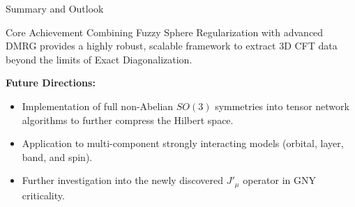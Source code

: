 \documentclass[xcolor=table, 11pt, aspectratio=169]{beamer}
\begin{document}
\begin{frame}{Summary and Outlook}
    \begin{block}{Core Achievement}
        Combining Fuzzy Sphere Regularization with advanced DMRG provides a highly robust, scalable framework to extract 3D CFT data beyond the limits of Exact Diagonalization.
    \end{block}
    \vspace{0.3cm}
    \textbf{Future Directions:}
    \begin{itemize}
        \item Implementation of full non-Abelian $SO(3)$ symmetries into tensor network algorithms to further compress the Hilbert space.
        \item Application to multi-component strongly interacting models (orbital, layer, band, and spin).
        \item Further investigation into the newly discovered $J'_\mu$ operator in GNY criticality.
    \end{itemize}
\end{frame}

\end{document}
